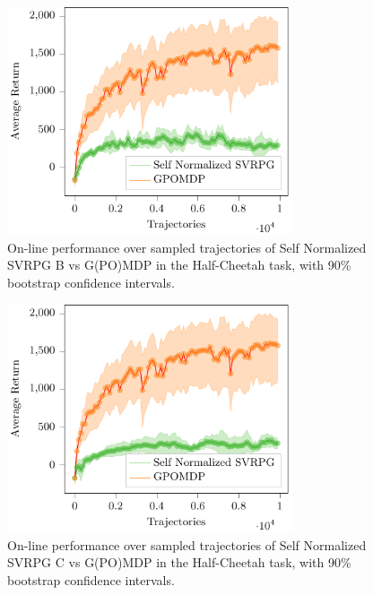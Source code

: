 \begin{figure}[h]
	\begin{minipage}[h]{1\textwidth}
		\centering
		\includegraphics[width=0.75\textwidth]{Images/Experiments/half_cheetah_GPOMDP_vs_SN_SVRPG_B.pdf}
		\vspace{-0.1in}
		\caption{On-line performance over sampled trajectories of Self Normalized \acs{SVRPG} B vs G(PO)MDP in the Half-Cheetah task, with 90\% bootstrap confidence intervals.}
		\label{fig:hcfive}
	\end{minipage}
	\vspace{-0.15in}
\end{figure}
\begin{figure}[h]
	\begin{minipage}[h]{1\textwidth}
		\centering
		\includegraphics[width=0.75\textwidth]{Images/Experiments/half_cheetah_GPOMDP_vs_SN_SVRPG_C.pdf}
		\vspace{-0.1in}
		\caption{On-line performance over sampled trajectories of Self Normalized \acs{SVRPG} C vs G(PO)MDP in the Half-Cheetah task, with 90\% bootstrap confidence intervals.}
		\label{fig:hcsix}
	\end{minipage}
	\vspace{-0.15in}
\end{figure}

